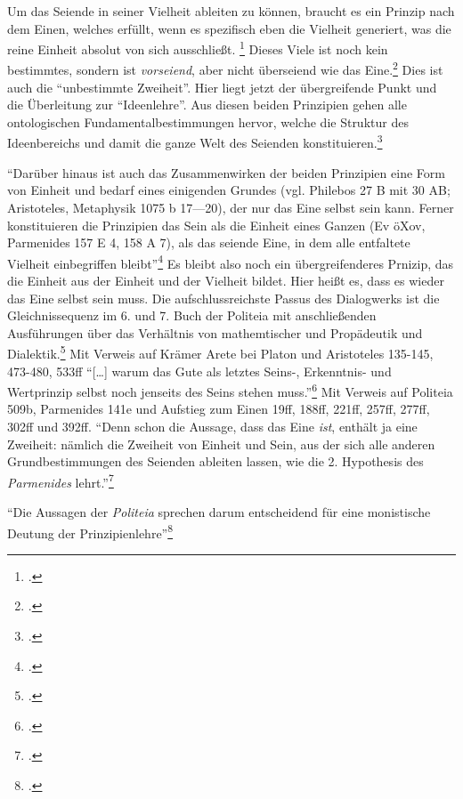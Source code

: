 Um das Seiende in seiner Vielheit ableiten zu können, braucht es ein Prinzip nach dem Einen, welches erfüllt, wenn es spezifisch eben die Vielheit generiert, was die reine Einheit absolut von sich ausschließt. \footcite[vgl.][S. 103]{halfwassen2015spuren} Dieses Viele ist noch kein bestimmtes, sondern ist \emph{vorseiend}, aber nicht überseiend wie das Eine.\footcite[vgl.][S. 103]{halfwassen2015spuren} Dies ist auch die \enquote{unbestimmte Zweiheit}.
Hier liegt jetzt der übergreifende Punkt und die Überleitung zur \enquote{Ideenlehre}. Aus diesen beiden Prinzipien gehen alle ontologischen Fundamentalbestimmungen hervor, welche die Struktur des Ideenbereichs und damit die ganze Welt des Seienden konstituieren.\footcite[vgl.][S. 104]{halfwassen2015spuren}

\enquote{Darüber hinaus ist auch das Zusammenwirken der beiden Prinzipien eine Form von Einheit und bedarf eines einigenden Grundes (vgl. Philebos 27 B mit 30 AB; Aristoteles, Metaphysik 1075 b 17—20), der nur das Eine selbst sein kann. Ferner konstituieren die Prinzipien das Sein als die Einheit eines Ganzen (Ev öXov, Parmenides 157 E 4, 158 A 7), als das seiende Eine, in dem alle entfaltete Vielheit einbegriffen bleibt}\footcite[][S. 106]{halfwassen2015spuren}
Es bleibt also noch ein übergreifenderes Prnizip, das die Einheit aus der Einheit und der Vielheit bildet. Hier heißt es, dass es wieder das Eine selbst sein muss.
{\color{red}{Übergang zu Politeia}}
Die aufschlussreichste Passus des Dialogwerks ist die Gleichnissequenz im 6. und 7. Buch der Politeia mit anschließenden Ausführungen über das Verhältnis von mathemtischer und Propädeutik und Dialektik.\footcite[vgl.][S. 135]{halfwassen2015spuren} Mit Verweis auf Krämer Arete bei Platon und Aristoteles 135-145, 473-480, 533ff
\enquote{[\dots] warum das Gute als letztes Seins-, Erkenntnis- und Wertprinzip selbst noch jenseits des Seins stehen muss.}\footcite[vgl.][S. 136]{halfwassen2015spuren} Mit Verweis auf Politeia 509b, Parmenides 141e und Aufstieg zum Einen 19ff, 188ff, 221ff, 257ff, 277ff, 302ff und 392ff. 
\enquote{Denn schon die Aussage, dass das Eine \emph{ist}, enthält ja eine Zweiheit: nämlich die Zweiheit von Einheit und Sein, aus der sich alle anderen Grundbestimmungen des Seienden ableiten lassen, wie die 2. Hypothesis des \emph{Parmenides} lehrt.}\footcite[][S. 136f.]{halfwassen2015spuren}

\enquote{Die Aussagen der \emph{Politeia} sprechen darum entscheidend für eine monistische Deutung der Prinzipienlehre}\footcite[][S. 137]{halfwassen2015spuren}


